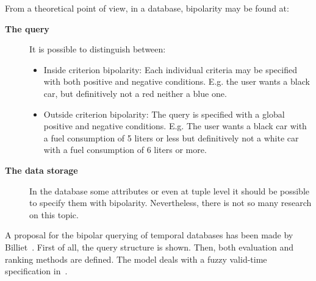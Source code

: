 From a theoretical point of view, in a database, bipolarity may be found at:
\begin{description}
\item[\textbf{The query}] It is possible to distinguish between:
	\begin{itemize}
	\item
	Inside criterion bipolarity: Each individual criteria may be specified with both positive and negative conditions. E.g. the user wants a black car, but definitively not a red neither a blue one.
	\item
	Outside criterion bipolarity: The query is specified with a global positive and negative conditions. E.g. The user wants a black car with a fuel consumption of 5 liters or less but definitively not a white car with a fuel consumption of 6 liters or more. 
	\end{itemize}
\item[\textbf{The data storage}] In the database some attributes or even at tuple level it should be possible to specify them with bipolarity. Nevertheless, there is not so many research on this topic.
\end{description}

A proposal for the bipolar querying of temporal databases has been made by Billiet~\cite{Billiet:Pons:Matthe:DeTre:Pons:2011:BipolarFuzzy}. First of all, the query structure is shown. Then, both evaluation and ranking methods are defined. The model deals with a fuzzy valid-time specification in~\cite{garrido2009}.

%
%

